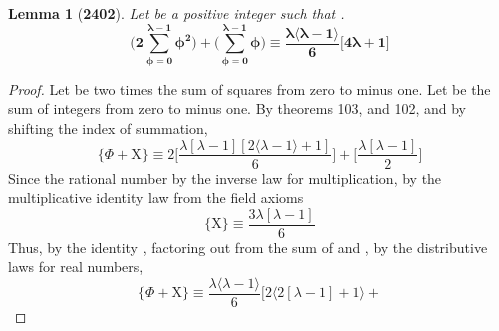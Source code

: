 \documentclass[preview]{standalone}
\newtheorem{lemma}{Lemma}
\begin{document}
\begin{lemma}[\textbf{2402}]
    Let \bm{$\iota$} be a positive integer such that
    \bm{$\big \lfloor \sqrt{\iota} \big \rfloor = \lambda$}.
    \begin{equation*}
        \bm{
            \Bigg( 2\sum_{\phi=0}^{\lambda - 1} \phi ^2 \Bigg)
                + 
            \Bigg( \sum_{\phi=0}^{\lambda - 1} \phi \Bigg)
                \equiv
            \frac{
                \lambda
                \big \langle \lambda - 1 \big \rangle
            }
            {6}
            \Bigg[
                4 \lambda + 1
            \Bigg]
        }
    \end{equation*}
\end{lemma}

\begin{proof}
    Let \bm{$\Phi$} be two times the sum of squares from zero to \bm{$\lambda$} minus one.
    Let  be the sum of integers from zero to \bm{$\lambda$} minus one.
    By theorems 103, and 102, and by shifting the index of summation,
    \begin{equation*}
        \Bigg\{
            \Phi + \mathrm{X}
        \Bigg\}
            \equiv
        2
        \Bigg[
            \frac{ 
                \lambda [ \lambda - 1 ]
                [ 2 \langle \lambda - 1 \rangle + 1 ] 
            }
            {6}
        \Bigg]
            +
        \Bigg[
            \frac{\lambda [ \lambda - 1 ] }
            {2}
        \Bigg]
    \end{equation*}
    Since the rational number 
    by the inverse law for multiplication,
    by the multiplicative identity law from the field axioms
    \begin{equation*}
        \bigg \{ \mathrm{X} \bigg\}   
            \equiv
        \frac{
            3
            \lambda [ \lambda - 1 ]
        }
        {6}
    \end{equation*}
    Thus, 
    by the identity , 
    factoring
    out from the sum of \bm{$\Phi$} and , 
    by the distributive laws for real numbers,
    \begin{equation*}
        \Bigg\{
            \Phi
                +
            \mathrm{X}
        \Bigg\}
            \equiv
        \frac{
            \lambda
            \big \langle \lambda - 1 \big \rangle
        }
        {6}
        \Bigg[
            2 \bigg \langle 2 [ \lambda - 1 ] + 1 \bigg \rangle
                +

\end{equation*}
\end{proof}
\end{document}

